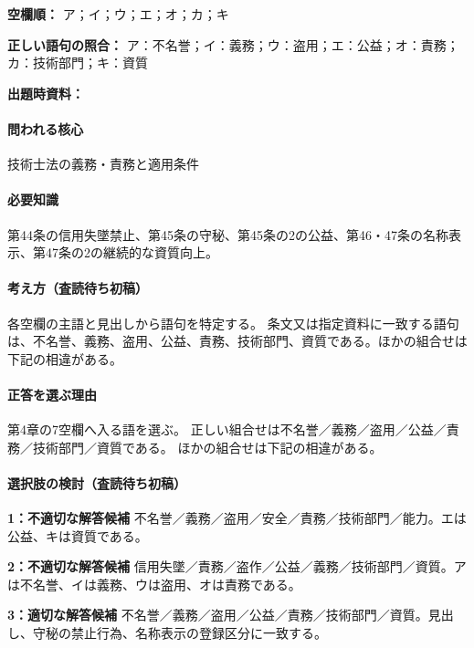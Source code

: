 \noindent\textbf{空欄順：} ア；イ；ウ；エ；オ；カ；キ\par

\noindent\textbf{正しい語句の照合：} ア：不名誉；イ：義務；ウ：盗用；エ：公益；オ：責務；カ：技術部門；キ：資質\par

\noindent\textbf{出題時資料：} \par

\paragraph{問われる核心} 技術士法の義務・責務と適用条件

\paragraph{必要知識} 第44条の信用失墜禁止、第45条の守秘、第45条の2の公益、第46・47条の名称表示、第47条の2の継続的な資質向上。

\paragraph{考え方（査読待ち初稿）} 各空欄の主語と見出しから語句を特定する。 条文又は指定資料に一致する語句は、不名誉、義務、盗用、公益、責務、技術部門、資質である。ほかの組合せは下記の相違がある。

\paragraph{正答を選ぶ理由} 第4章の7空欄へ入る語を選ぶ。 正しい組合せは不名誉／義務／盗用／公益／責務／技術部門／資質である。 ほかの組合せは下記の相違がある。

\paragraph{選択肢の検討（査読待ち初稿）}\mbox{}\par

\noindent\textbf{1：不適切な解答候補} 不名誉／義務／盗用／安全／責務／技術部門／能力。エは公益、キは資質である。\par

\noindent\textbf{2：不適切な解答候補} 信用失墜／責務／盗作／公益／義務／技術部門／資質。アは不名誉、イは義務、ウは盗用、オは責務である。\par

\noindent\textbf{3：適切な解答候補} 不名誉／義務／盗用／公益／責務／技術部門／資質。見出し、守秘の禁止行為、名称表示の登録区分に一致する。\par

